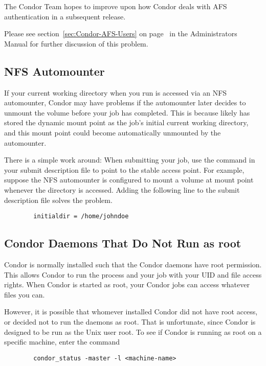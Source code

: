 The Condor Team hopes to improve upon how Condor deals with AFS 
authentication in a subsequent release.

Please see section~\ref{sec:Condor-AFS-Users} on
page~\pageref{sec:Condor-AFS-Users} in the Administrators Manual for
further discussion of this problem.

\subsection{NFS Automounter}

If your current working directory when you run 
is accessed via an NFS automounter, Condor may have problems if the
automounter later decides to unmount the volume before your job has
completed.
This is because  likely has stored the
dynamic mount point as the job's initial current working directory, and
this mount point could become automatically unmounted by the
automounter.

There is a simple work around: When submitting your job, use the 
 command in your submit description file to point to
the stable access point.
For example,
suppose the NFS automounter is configured to mount a volume at mount point
whenever the directory  is accessed.
Adding the following line to the
submit description file solves the problem.
\begin{verbatim}
        initialdir = /home/johndoe
\end{verbatim}

\subsection{Condor Daemons That Do Not Run as root}

Condor is normally installed such that the Condor daemons have root
permission.
This allows Condor to run the  
process and
your job with your UID and file access rights.
When Condor
is started as root, your Condor jobs can access whatever files you can.

However, it is possible that whomever installed Condor 
did not have root access, or
decided not to run the daemons as root.
That is unfortunate,
since Condor is designed to be run as the Unix user root.
To see if Condor is
running as root on a specific machine, enter the command
\begin{verbatim}
        condor_status -master -l <machine-name>
\end{verbatim}

